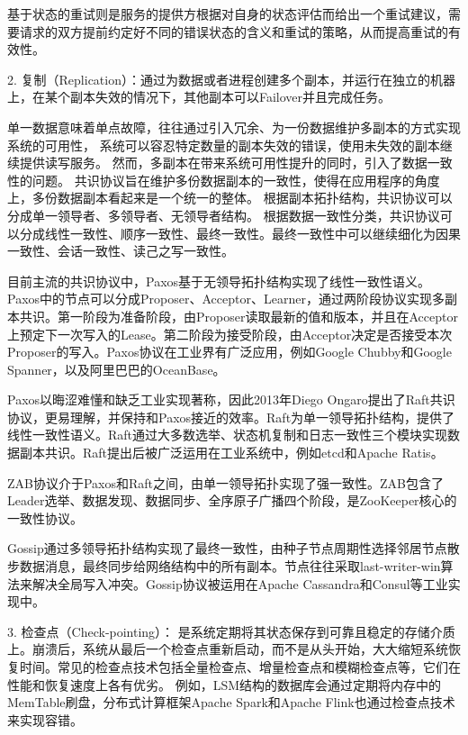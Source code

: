 基于状态的重试则是服务的提供方根据对自身的状态评估而给出一个重试建议，需要请求的双方提前约定好不同的错误状态的含义和重试的策略，从而提高重试的有效性。


2. 复制（Replication）：通过为数据或者进程创建多个副本，并运行在独立的机器上，在某个副本失效的情况下，其他副本可以Failover并且完成任务。

单一数据意味着单点故障，往往通过引入冗余、为一份数据维护多副本的方式实现系统的可用性，
系统可以容忍特定数量的副本失效的错误，使用未失效的副本继续提供读写服务。
然而，多副本在带来系统可用性提升的同时，引入了数据一致性的问题。
共识协议旨在维护多份数据副本的一致性，使得在应用程序的角度上，多份数据副本看起来是一个统一的整体。
根据副本拓扑结构，共识协议可以分成单一领导者、多领导者、无领导者结构。
根据数据一致性分类，共识协议可以分成线性一致性\cite{herlihy1990linearizability}、顺序一致性\cite{attiya1994sequential}、最终一致性\cite{bailis2013eventual}。最终一致性中可以继续细化为因果一致性\cite{lloyd2011cops}、会话一致性\cite{mortazavi2018session}、读己之写一致性\cite{nishtala2013memcached}。

目前主流的共识协议中，Paxos\cite{lamport2001paxos}基于无领导拓扑结构实现了线性一致性语义。Paxos中的节点可以分成Proposer、Acceptor、Learner，通过两阶段协议实现多副本共识。第一阶段为准备阶段，由Proposer读取最新的值和版本，并且在Acceptor上预定下一次写入的Lease。第二阶段为接受阶段，由Acceptor决定是否接受本次Proposer的写入。Paxos协议在工业界有广泛应用，例如Google Chubby\cite{burrows2006chubby}和Google Spanner\cite{corbett2013spanner}，以及阿里巴巴的OceanBase\cite{zhen2014oceanbase}。

Paxos以晦涩难懂和缺乏工业实现著称，因此2013年Diego Ongaro提出了Raft\cite{ongaro2014raft}共识协议，更易理解，并保持和Paxos接近的效率。Raft为单一领导拓扑结构，提供了线性一致性语义。Raft通过大多数选举、状态机复制和日志一致性三个模块实现数据副本共识。Raft提出后被广泛运用在工业系统中，例如etcd\cite{etcd}和Apache Ratis\cite{ratis}。

ZAB\cite{junqueira2011zab}协议介于Paxos和Raft之间，由单一领导拓扑实现了强一致性。ZAB包含了Leader选举、数据发现、数据同步、全序原子广播四个阶段，是ZooKeeper\cite{hunt2010zookeeper}核心的一致性协议。

Gossip\cite{demers1987gossip}通过多领导拓扑结构实现了最终一致性，由种子节点周期性选择邻居节点散步数据消息，最终同步给网络结构中的所有副本。节点往往采取last-writer-win算法来解决全局写入冲突。Gossip协议被运用在Apache Cassandra\cite{lakshman2010cassandra}和Consul\cite{mishra1993consul}等工业实现中。

3. 检查点（Check-pointing）： 是系统定期将其状态保存到可靠且稳定的存储介质上。崩溃后，系统从最后一个检查点重新启动，而不是从头开始，大大缩短系统恢复时间。常见的检查点技术包括全量检查点、增量检查点和模糊检查点等，它们在性能和恢复速度上各有优劣。
例如，LSM结构\cite{o1996lsmtree}的数据库会通过定期将内存中的MemTable刷盘，分布式计算框架Apache Spark\cite{zaharia2016spark}和Apache Flink\cite{carbone2015flink}也通过检查点技术来实现容错。

